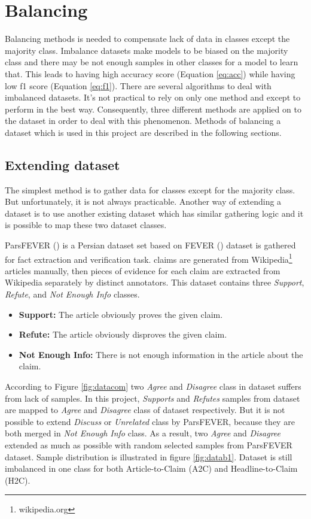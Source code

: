 \section{Balancing}
\label{mth:balance}
Balancing methods is needed to compensate lack of data in classes except the majority class. Imbalance datasets make models to be biased on the majority class and there may be not enough samples in other classes for a model to learn that. This leads to having high accuracy score (Equation \ref{eq:acc}) while having low f1 score (Equation \ref{eq:f1}). There are several algorithms to deal with imbalanced datasets. It's not practical to rely on only one method and except to perform in the best way. Consequently, three different methods are applied on to the dataset in order to deal with this phenomenon. Methods of balancing a dataset which is used in this project are described in the following sections.  
	
\subsection{Extending dataset}
The simplest method is to gather data for classes except for the majority class. But unfortunately, it is not always practicable. Another way of extending a dataset is to use another existing dataset which has similar gathering logic and it is possible to map these two dataset classes. 

ParsFEVER (\cite{parsfever}) is a Persian dataset set based on FEVER (\cite{fever}) dataset is gathered for fact extraction and verification task. \cite{parsfever} claims are generated from Wikipedia\footnote{wikipedia.org} articles manually, then pieces of evidence for each claim are extracted from Wikipedia separately by distinct annotators. This dataset contains three \textit{Support}, \textit{Refute}, and \textit{Not Enough Info} classes. 
\begin{itemize}
	\item {\color{green!70!black}\textbf{Support:}} The article obviously proves the given claim. 
	\item {\color{red!60!black}\textbf{Refute:}} The article obviously disproves the given claim.
	\item {\color{gray}\textbf{Not Enough Info:}} There is not enough information in the article about the claim. 
\end{itemize}                

According to Figure \ref{fig:datacom} two \textit{Agree} and \textit{Disagree} class in \cite{stance_persian} dataset suffers from lack of samples. In this project, \textit{Supports} and \textit{Refutes} samples from \cite{parsfever} dataset are mapped to \textit{Agree} and \textit{Disagree} class of \cite{stance_persian} dataset respectively. 
But it is not possible to extend \textit{Discuss} or \textit{Unrelated} class by ParsFEVER, because they are both merged in \textit{Not Enough Info} class. As a result, two \textit{Agree} and \textit{Disagree} extended as much as possible with random selected samples from ParsFEVER dataset. Sample distribution is illustrated in figure \ref{fig:datab1}. Dataset is still imbalanced in one class for both Article-to-Claim (\ac{A2C}) and Headline-to-Claim (\ac{H2C}).


